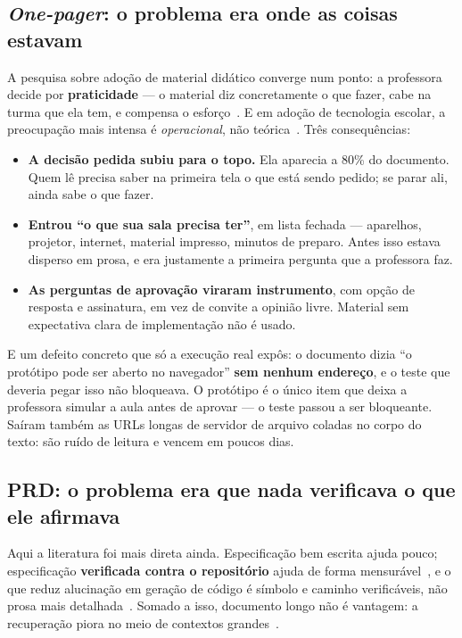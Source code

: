 \documentclass[11pt,a4paper]{article}
\begin{document}
\subsection{\emph{One-pager}: o problema era onde as coisas estavam}

A pesquisa sobre adoção de material didático converge num ponto: a professora decide por \textbf{praticidade} --- o material diz concretamente o que fazer, cabe na turma que ela tem, e compensa o esforço~\cite{doyle1977}. E em adoção de tecnologia escolar, a preocupação mais intensa é \emph{operacional}, não teórica~\cite{cbam2015}. Três consequências:

\begin{itemize}
  \item \textbf{A decisão pedida subiu para o topo.} Ela aparecia a 80\% do documento. Quem lê precisa saber na primeira tela o que está sendo pedido; se parar ali, ainda sabe o que fazer.
  \item \textbf{Entrou ``o que sua sala precisa ter''}, em lista fechada --- aparelhos, projetor, internet, material impresso, minutos de preparo. Antes isso estava disperso em prosa, e era justamente a primeira pergunta que a professora faz.
  \item \textbf{As perguntas de aprovação viraram instrumento}, com opção de resposta e assinatura, em vez de convite a opinião livre. Material sem expectativa clara de implementação não é usado.
\end{itemize}

E um defeito concreto que só a execução real expôs: o documento dizia ``o protótipo pode ser aberto no navegador'' \textbf{sem nenhum endereço}, e o teste que deveria pegar isso não bloqueava. O protótipo é o único item que deixa a professora simular a aula antes de aprovar --- o teste passou a ser bloqueante. Saíram também as URLs longas de servidor de arquivo coladas no corpo do texto: são ruído de leitura e vencem em poucos dias.

\subsection{PRD: o problema era que nada verificava o que ele afirmava}

Aqui a literatura foi mais direta ainda. Especificação bem escrita ajuda pouco; especificação \textbf{verificada contra o repositório} ajuda de forma mensurável~\cite{speckit2026}, e o que reduz alucinação em geração de código é símbolo e caminho verificáveis, não prosa mais detalhada~\cite{dehallucinator2024}. Somado a isso, documento longo não é vantagem: a recuperação piora no meio de contextos grandes~\cite{liu2024}.
\end{document}
